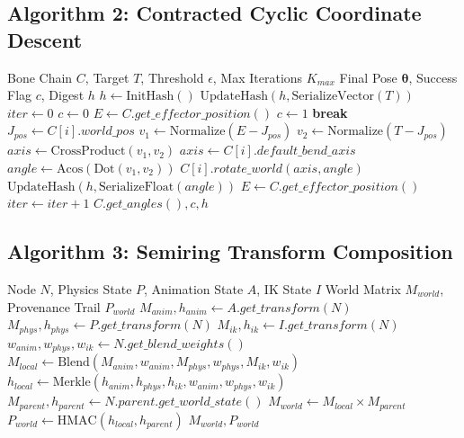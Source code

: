 \documentclass[sigconf,nonacm]{acmart}
\newcommand{\ikcontract}{\textsc{IKContract}}
\newcommand{\transformgraph}{\textsc{TransformGraph}}
\begin{document}
\subsection{Algorithm 2: Contracted Cyclic Coordinate Descent}
\begin{algorithm}
\caption{Contracted CCD Solver (\ikcontract{})}
\label{alg:ccd}
\begin{algorithmic}[1]
\Require Bone Chain $C$, Target $T$, Threshold $\epsilon$, Max Iterations $K_{max}$
\Ensure Final Pose $\mathbf{\theta}$, Success Flag $c$, Digest $h$
\State $h \gets \text{InitHash}()$
\State $\text{UpdateHash}(h, \text{SerializeVector}(T))$
\State $iter \gets 0$
\State $c \gets 0$
    \State $E \gets C.get\_effector\_position()$
        \State $c \gets 1$
        \State \textbf{break}
    \EndIf
        \State $J_{pos} \gets C[i].world\_pos$
        \State $v_1 \gets \text{Normalize}(E - J_{pos})$
        \State $v_2 \gets \text{Normalize}(T - J_{pos})$
        \State $axis \gets \text{CrossProduct}(v_1, v_2)$
         
            \State $axis \gets C[i].default\_bend\_axis$
        \EndIf
        \State $angle \gets \text{Acos}(\text{Dot}(v_1, v_2))$
        \State $C[i].rotate\_world(axis, angle)$
        \State $\text{UpdateHash}(h, \text{SerializeFloat}(angle))$
        \State $E \gets C.get\_effector\_position()$
    \EndFor
    \State $iter \gets iter + 1$
\EndWhile
\State \Return $C.get\_angles(), c, h$
\end{algorithmic}
\end{algorithm}

\subsection{Algorithm 3: Semiring Transform Composition}
\begin{algorithm}
\caption{Semiring Composer (\transformgraph{})}
\label{alg:semiring}
\begin{algorithmic}[1]
\Require Node $N$, Physics State $P$, Animation State $A$, IK State $I$
\Ensure World Matrix $M_{world}$, Provenance Trail $P_{world}$
\State $M_{anim}, h_{anim} \gets A.get\_transform(N)$
\State $M_{phys}, h_{phys} \gets P.get\_transform(N)$
\State $M_{ik}, h_{ik} \gets I.get\_transform(N)$
\State $w_{anim}, w_{phys}, w_{ik} \gets N.get\_blend\_weights()$
\State {}
\State $M_{local} \gets \text{Blend}(M_{anim}, w_{anim}, M_{phys}, w_{phys}, M_{ik}, w_{ik})$
\State $h_{local} \gets \text{Merkle}(h_{anim}, h_{phys}, h_{ik}, w_{anim}, w_{phys}, w_{ik})$
\State {}
\State $M_{parent}, h_{parent} \gets N.parent.get\_world\_state()$
\State $M_{world} \gets M_{local} \times M_{parent}$
\State $P_{world} \gets \text{HMAC}(h_{local}, h_{parent})$
\State \Return $M_{world}, P_{world}$
\end{algorithmic}
\end{algorithm}
\end{document}
